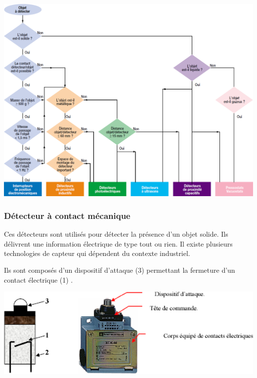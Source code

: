 \documentclass[10pt]{article}
\begin{document}
\begin{center}
    \includegraphics[width=.9\textwidth]{images/organigramme}
\end{center}

\subsubsection{Détecteur à contact mécanique}
Ces détecteurs sont utilisés pour détecter la présence d'un objet solide. Ils délivrent une information électrique de type tout ou rien. Il existe plusieurs technologies de capteur qui dépendent du contexte industriel.


\begin{minipage}[c]{.45\linewidth}
Ils sont composés d'un dispositif d'attaque (3) permettant la fermeture d'un contact électrique (1) \cite{banna}.
\end{minipage}\hfill
\begin{minipage}[c]{.5\linewidth}
\begin{center}
    \includegraphics[width=.95\textwidth]{images/interrupteur_position_3}
\end{center}
\end{minipage}
\end{document}
